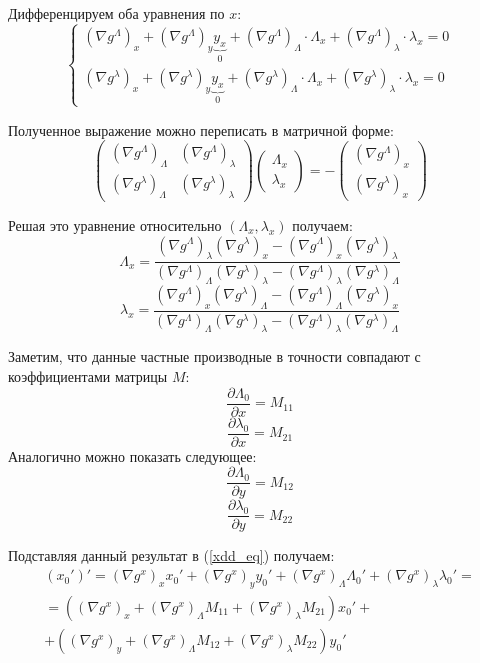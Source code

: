 \begin{enumerate}
Дифференцируем оба уравнения по \(x\):
\[
\begin{cases}
(\nabla g^\Lambda)_x + (\nabla g^\Lambda)_y \underbrace{y_x}_0 + (\nabla g^\Lambda)_\Lambda \cdot \Lambda_x + (\nabla g^\Lambda)_\lambda \cdot \lambda_x = 0 \\
(\nabla g^\lambda)_x + (\nabla g^\lambda)_y \underbrace{y_x}_0 + (\nabla g^\lambda)_\Lambda \cdot \Lambda_x + (\nabla g^\lambda)_\lambda \cdot \lambda_x = 0
\end{cases}
\]

Полученное выражение можно переписать в матричной форме:
\[
\begin{pmatrix}
(\nabla g^\Lambda)_\Lambda & (\nabla g^\Lambda)_\lambda \\
(\nabla g^\lambda)_\Lambda & (\nabla g^\lambda)_\lambda
\end{pmatrix}
\begin{pmatrix}
\Lambda_x \\
\lambda_x
\end{pmatrix}
= -
\begin{pmatrix}
(\nabla g^\Lambda)_x \\
(\nabla g^\lambda)_x
\end{pmatrix}
\]

Решая это уравнение относительно $(\Lambda_x,\lambda_x)$ получаем:
$$
\Lambda_x = \frac{(\nabla g^\Lambda)_\lambda (\nabla g^\lambda)_x - (\nabla g^\Lambda)_x (\nabla g^\lambda)_\lambda}{(\nabla g^\Lambda)_\Lambda (\nabla g^\lambda)_\lambda - (\nabla g^\Lambda)_\lambda (\nabla g^\lambda)_\Lambda}
$$
$$
\lambda_x = \frac{(\nabla g^\Lambda)_x (\nabla g^\lambda)_\Lambda - (\nabla g^\Lambda)_\Lambda (\nabla g^\lambda)_x}{(\nabla g^\Lambda)_\Lambda (\nabla g^\lambda)_\lambda - (\nabla g^\Lambda)_\lambda (\nabla g^\lambda)_\Lambda}
$$

Заметим, что данные частные производные в точности совпадают с коэффициентами матрицы $M$:
$$
\frac{\partial \Lambda_0}{\partial x} = M_{11}
$$
$$
\frac{\partial \lambda_0}{\partial x} = M_{21}
$$
Аналогично можно показать следующее:
$$
\frac{\partial \Lambda_0}{\partial y} = M_{12}
$$
$$
\frac{\partial \lambda_0}{\partial y} = M_{22}
$$

Подставляя данный результат в (\ref{xdd_eq}) получаем:
\begin{multline}
(x_0')' = (\nabla g^x)_x x_0' + (\nabla g^x)_y y_0' + (\nabla g^x)_\Lambda \Lambda_0' + (\nabla g^x)_\lambda \lambda_0' = \\
= 
\left( (\nabla g^x)_x + (\nabla g^x)_\Lambda M_{11} + (\nabla g^x)_\lambda M_{21} \right) x_0' +\\
+\left( (\nabla g^x)_y + (\nabla g^x)_\Lambda M_{12} + (\nabla g^x)_\lambda M_{22} \right) y_0'
\label{xdd_eq2}
\end{multline}


\end{enumerate}
